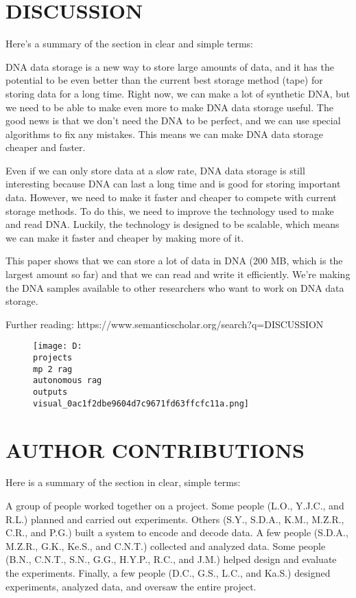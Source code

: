 \documentclass[12pt,a4paper]{article}
\begin{document}
\section{DISCUSSION}
Here's a summary of the section in clear and simple terms:

DNA data storage is a new way to store large amounts of data, and it has the potential to be even better than the current best storage method (tape) for storing data for a long time. Right now, we can make a lot of synthetic DNA, but we need to be able to make even more to make DNA data storage useful. The good news is that we don't need the DNA to be perfect, and we can use special algorithms to fix any mistakes. This means we can make DNA data storage cheaper and faster.

Even if we can only store data at a slow rate, DNA data storage is still interesting because DNA can last a long time and is good for storing important data. However, we need to make it faster and cheaper to compete with current storage methods. To do this, we need to improve the technology used to make and read DNA. Luckily, the technology is designed to be scalable, which means we can make it faster and cheaper by making more of it.

This paper shows that we can store a lot of data in DNA (200 MB, which is the largest amount so far) and that we can read and write it efficiently. We're making the DNA samples available to other researchers who want to work on DNA data storage.

Further reading: https://www.semanticscholar.org/search?q=DISCUSSION
\begin{figure}[h]
\centering
\texttt{[image: D:\\projects\\mp 2 rag\\autonomous rag\\outputs\\visual\_0ac1f2dbe9604d7c9671fd63ffcfc11a.png]}
\end{figure}
\section{AUTHOR CONTRIBUTIONS}
Here is a summary of the section in clear, simple terms:

A group of people worked together on a project. Some people (L.O., Y.J.C., and R.L.) planned and carried out experiments. Others (S.Y., S.D.A., K.M., M.Z.R., C.R., and P.G.) built a system to encode and decode data. A few people (S.D.A., M.Z.R., G.K., Ke.S., and C.N.T.) collected and analyzed data. Some people (B.N., C.N.T., S.N., G.G., H.Y.P., R.C., and J.M.) helped design and evaluate the experiments. Finally, a few people (D.C., G.S., L.C., and Ka.S.) designed experiments, analyzed data, and oversaw the entire project.
\end{document}
